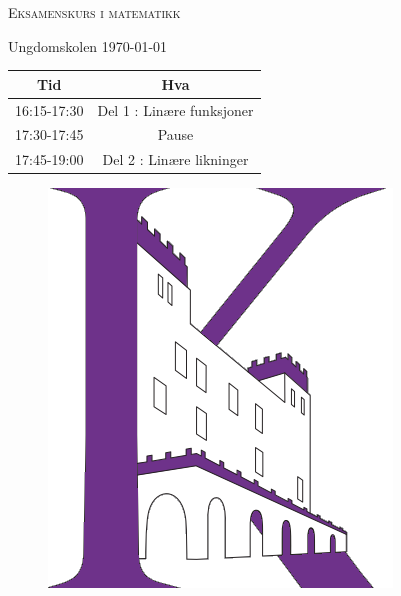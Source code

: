 \documentclass[12pt]{exam}
\begin{document}
\pagestyle{headandfoot}
\runningheadrule
\firstpageheader{}{}{}
\firstpagefooter{}{}{}
\runningfooter{}{}{}



{  \centering

	{\scshape\Huge Eksamenskurs i matematikk \par}
	\vspace{1cm}
	{\Large Ungdomskolen \today \par}
	\vspace{1.5cm}
        \begin{center}
          { \large
          \begin{tabular}{c | c}
            Tid & Hva \\ \hline
            16:15-17:30 & Del 1 : Linære funksjoner\\ \hline
            17:30-17:45 & Pause \\\hline
            17:45-19:00 & Del 2 : Linære likninger\\\hline
          \end{tabular}
          }
          \vspace{1.5cm}
          \begin{figure}[h!]
            \centering
            \includegraphics[scale = 0.7]{./img/forside.png}                      
          \end{figure}

        \end{center}

}
\end{document}
